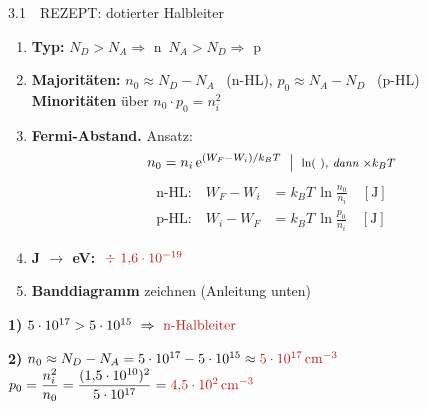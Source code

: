 


\begin{RezeptA}{3.1\ \ REZEPT: dotierter Halbleiter \hfill
  }


\Kette
\begin{enumerate}
\item \textbf{Typ:} $N_D>N_A\Rightarrow$ n\quad\ $N_A>N_D\Rightarrow$ p
\item \textbf{Majoritäten:} $n_0\approx N_D-N_A$ \ (n-HL),
      $p_0\approx N_A-N_D$ \ (p-HL)\\
      \textbf{Minoritäten} über $n_0\cdot p_0=n_i^2$
\item \textbf{Fermi-Abstand.} Ansatz:
      \[ n_0=n_i\,\mathrm{e}^{(W_F-W_i)/k_BT}
         \;\bigm|\;\text{\footnotesize\itshape $\ln(\ )$, dann $\times k_BT$} \]
      \vspace{-3.2mm}
      \begin{align*}
      \text{n-HL:}\quad W_F-W_i &= k_B T\,\ln\frac{n_0}{n_i}\quad[\mathrm{J}]\\[-0.3mm]
      \text{p-HL:}\quad W_i-W_F &= k_B T\,\ln\frac{p_0}{n_i}\quad[\mathrm{J}]
      \end{align*}
      \vspace{-3.2mm}
\item \textbf{J $\to$ eV:} $\ \erg{\div\ 1{,}6\cdot10^{-19}}$
\item \textbf{Banddiagramm} zeichnen (Anleitung unten)
\end{enumerate}

\FSline
\Beispiel[$N_D=5\cdot10^{17}$, $N_A=5\cdot10^{15}\,\mathrm{cm^{-3}}$]
\textbf{1)} $5\cdot10^{17}>5\cdot10^{15}\ \Rightarrow\ \erg{\text{n-Halbleiter}}$
\vspace{0.3mm}

\textbf{2)} $n_0\approx N_D-N_A=5\cdot10^{17}-5\cdot10^{15}
 \approx\erg{5\cdot10^{17}\,\mathrm{cm^{-3}}}$\\
$p_0=\dfrac{n_i^2}{n_0}=\dfrac{(1{,}5\cdot10^{10})^2}{5\cdot10^{17}}
 =\erg{4{,}5\cdot10^{2}\,\mathrm{cm^{-3}}}$
\vspace{0.3mm}


\end{RezeptA}
